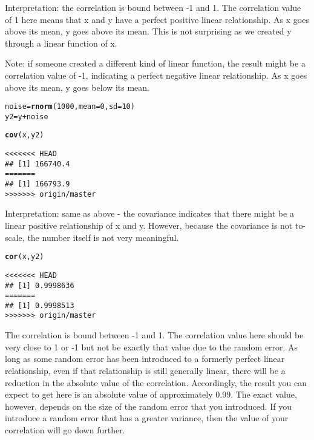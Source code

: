 \documentclass[12pt,letter]{article}\usepackage[]{graphicx}\usepackage[]{color}
\makeatletter
\newcommand{\hlnum}[1]{\textcolor[rgb]{0.686,0.059,0.569}{#1}}%
\newcommand{\hlopt}[1]{\textcolor[rgb]{0,0,0}{#1}}%
\newcommand{\hlstd}[1]{\textcolor[rgb]{0.345,0.345,0.345}{#1}}%
\newcommand{\hlkwb}[1]{\textcolor[rgb]{0.69,0.353,0.396}{#1}}%
\newcommand{\hlkwc}[1]{\textcolor[rgb]{0.333,0.667,0.333}{#1}}%
\newcommand{\hlkwd}[1]{\textcolor[rgb]{0.737,0.353,0.396}{\textbf{#1}}}%
\newenvironment{kframe}{%
 \def\at@end@of@kframe{}%
 \ifinner\ifhmode%
  \def\at@end@of@kframe{\end{minipage}}%
  \begin{minipage}{\columnwidth}%
 \fi\fi%
 \def\FrameCommand##1{\hskip\@totalleftmargin \hskip-\fboxsep
 \colorbox{shadecolor}{##1}\hskip-\fboxsep
     \hskip-\linewidth \hskip-\@totalleftmargin \hskip\columnwidth}%
 \MakeFramed {\advance\hsize-\width
   \@totalleftmargin\z@ \linewidth\hsize
   \@setminipage}}%
 {\par\unskip\endMakeFramed%
 \at@end@of@kframe}
\newenvironment{knitrout}{}{} %
\makeatother
\begin{document}
Interpretation: the correlation is bound between -1 and 1. The correlation value of 1 here means that x and y have a perfect positive linear relationship. As x goes above its mean, y goes above its mean. This is not surprising as we created y through a linear function of x.

Note: if someone created a different kind of linear function, the result might be a correlation value of -1, indicating a perfect negative linear relationship. As x goes above its mean, y goes below its mean.

\begin{knitrout}
\color{fgcolor}\begin{kframe}
\begin{alltt}
\hlstd{noise} \hlkwb{=} \hlkwd{rnorm}\hlstd{(}\hlnum{1000}\hlstd{,} \hlkwc{mean} \hlstd{=} \hlnum{0}\hlstd{,} \hlkwc{sd} \hlstd{=} \hlnum{10}\hlstd{)}
\hlstd{y2} \hlkwb{=} \hlstd{y} \hlopt{+} \hlstd{noise}

\hlkwd{cov}\hlstd{(x, y2)}
\end{alltt}
\begin{verbatim}
<<<<<<< HEAD
## [1] 166740.4
=======
## [1] 166793.9
>>>>>>> origin/master
\end{verbatim}
\end{kframe}
\end{knitrout}

Interpretation: same as above - the covariance indicates that there might be a linear positive relationship of x and y. However, because the covariance is not to-scale, the number itself is not very meaningful.

\begin{knitrout}
\color{fgcolor}\begin{kframe}
\begin{alltt}
\hlkwd{cor}\hlstd{(x, y2)}
\end{alltt}
\begin{verbatim}
<<<<<<< HEAD
## [1] 0.9998636
=======
## [1] 0.9998513
>>>>>>> origin/master
\end{verbatim}
\end{kframe}
\end{knitrout}

The correlation is bound between -1 and 1. The correlation value here should be very close to 1 or -1 but not be exactly that value due to the random error. As long as some random error has been introduced to a formerly perfect linear relationship, even if that relationship is still generally linear, there will be a reduction in the absolute value of the correlation. Accordingly, the result you can expect to get here is an absolute value of approximately 0.99. The exact value, however, depends on the size of the random error that you introduced. If you introduce a random error that has a greater variance, then the value of your correlation will go down further.
\end{document}

